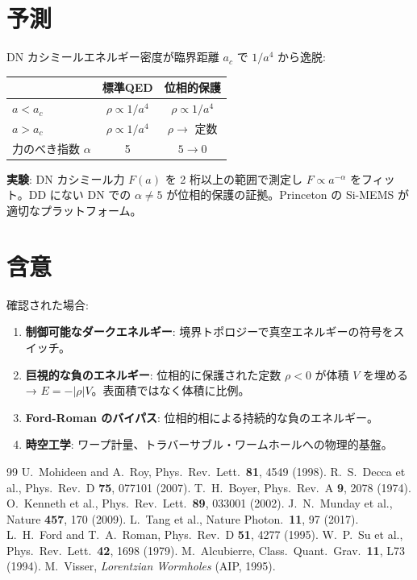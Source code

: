 \documentclass[11pt,a4paper]{article}
\begin{document}
\section{予測}

DN カシミールエネルギー密度が臨界距離 $a_c$ で $1/a^4$ から逸脱:

\begin{center}
\begin{tabular}{lcc}
\toprule
& 標準QED & 位相的保護 \\
\midrule
$a < a_c$ & $\rho \propto 1/a^4$ & $\rho \propto 1/a^4$ \\
$a > a_c$ & $\rho \propto 1/a^4$ & $\rho \to$ 定数 \\
\midrule
力のべき指数 $\alpha$ & 5 & $5 \to 0$ \\
\bottomrule
\end{tabular}
\end{center}

\textbf{実験}: DN カシミール力 $F(a)$ を 2 桁以上の範囲で測定し $F \propto a^{-\alpha}$ をフィット。DD にない DN での $\alpha \neq 5$ が位相的保護の証拠。Princeton の Si-MEMS が適切なプラットフォーム。

\section{含意}

確認された場合:
\begin{enumerate}
\item \textbf{制御可能なダークエネルギー}: 境界トポロジーで真空エネルギーの符号をスイッチ。
\item \textbf{巨視的な負のエネルギー}: 位相的に保護された定数 $\rho < 0$ が体積 $V$ を埋める → $E = -|\rho|V$。表面積ではなく体積に比例。
\item \textbf{Ford-Roman のバイパス}: 位相的相による持続的な負のエネルギー。
\item \textbf{時空工学}: ワープ計量、トラバーサブル・ワームホールへの物理的基盤。
\end{enumerate}

\begin{thebibliography}{99}
 U.~Mohideen and A.~Roy, Phys.\ Rev.\ Lett.\ \textbf{81}, 4549 (1998).
 R.~S.~Decca et al., Phys.\ Rev.\ D \textbf{75}, 077101 (2007).
 T.~H.~Boyer, Phys.\ Rev.\ A \textbf{9}, 2078 (1974).
 O.~Kenneth et al., Phys.\ Rev.\ Lett.\ \textbf{89}, 033001 (2002).
 J.~N.~Munday et al., Nature \textbf{457}, 170 (2009).
 L.~Tang et al., Nature Photon.\ \textbf{11}, 97 (2017).
 L.~H.~Ford and T.~A.~Roman, Phys.\ Rev.\ D \textbf{51}, 4277 (1995).
 W.~P.~Su et al., Phys.\ Rev.\ Lett.\ \textbf{42}, 1698 (1979).
 M.~Alcubierre, Class.\ Quant.\ Grav.\ \textbf{11}, L73 (1994).
 M.~Visser, \textit{Lorentzian Wormholes} (AIP, 1995).
\end{thebibliography}
\end{document}
